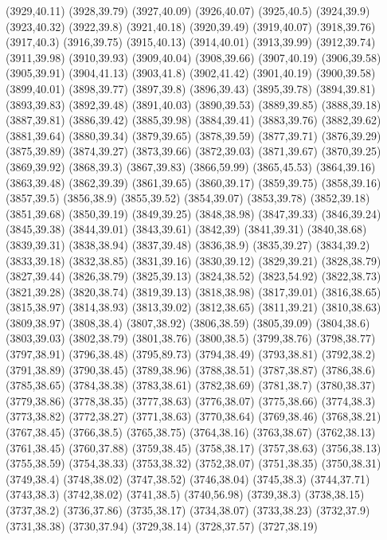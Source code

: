 (3929,40.11)
(3928,39.79)
(3927,40.09)
(3926,40.07)
(3925,40.5)
(3924,39.9)
(3923,40.32)
(3922,39.8)
(3921,40.18)
(3920,39.49)
(3919,40.07)
(3918,39.76)
(3917,40.3)
(3916,39.75)
(3915,40.13)
(3914,40.01)
(3913,39.99)
(3912,39.74)
(3911,39.98)
(3910,39.93)
(3909,40.04)
(3908,39.66)
(3907,40.19)
(3906,39.58)
(3905,39.91)
(3904,41.13)
(3903,41.8)
(3902,41.42)
(3901,40.19)
(3900,39.58)
(3899,40.01)
(3898,39.77)
(3897,39.8)
(3896,39.43)
(3895,39.78)
(3894,39.81)
(3893,39.83)
(3892,39.48)
(3891,40.03)
(3890,39.53)
(3889,39.85)
(3888,39.18)
(3887,39.81)
(3886,39.42)
(3885,39.98)
(3884,39.41)
(3883,39.76)
(3882,39.62)
(3881,39.64)
(3880,39.34)
(3879,39.65)
(3878,39.59)
(3877,39.71)
(3876,39.29)
(3875,39.89)
(3874,39.27)
(3873,39.66)
(3872,39.03)
(3871,39.67)
(3870,39.25)
(3869,39.92)
(3868,39.3)
(3867,39.83)
(3866,59.99)
(3865,45.53)
(3864,39.16)
(3863,39.48)
(3862,39.39)
(3861,39.65)
(3860,39.17)
(3859,39.75)
(3858,39.16)
(3857,39.5)
(3856,38.9)
(3855,39.52)
(3854,39.07)
(3853,39.78)
(3852,39.18)
(3851,39.68)
(3850,39.19)
(3849,39.25)
(3848,38.98)
(3847,39.33)
(3846,39.24)
(3845,39.38)
(3844,39.01)
(3843,39.61)
(3842,39)
(3841,39.31)
(3840,38.68)
(3839,39.31)
(3838,38.94)
(3837,39.48)
(3836,38.9)
(3835,39.27)
(3834,39.2)
(3833,39.18)
(3832,38.85)
(3831,39.16)
(3830,39.12)
(3829,39.21)
(3828,38.79)
(3827,39.44)
(3826,38.79)
(3825,39.13)
(3824,38.52)
(3823,54.92)
(3822,38.73)
(3821,39.28)
(3820,38.74)
(3819,39.13)
(3818,38.98)
(3817,39.01)
(3816,38.65)
(3815,38.97)
(3814,38.93)
(3813,39.02)
(3812,38.65)
(3811,39.21)
(3810,38.63)
(3809,38.97)
(3808,38.4)
(3807,38.92)
(3806,38.59)
(3805,39.09)
(3804,38.6)
(3803,39.03)
(3802,38.79)
(3801,38.76)
(3800,38.5)
(3799,38.76)
(3798,38.77)
(3797,38.91)
(3796,38.48)
(3795,89.73)
(3794,38.49)
(3793,38.81)
(3792,38.2)
(3791,38.89)
(3790,38.45)
(3789,38.96)
(3788,38.51)
(3787,38.87)
(3786,38.6)
(3785,38.65)
(3784,38.38)
(3783,38.61)
(3782,38.69)
(3781,38.7)
(3780,38.37)
(3779,38.86)
(3778,38.35)
(3777,38.63)
(3776,38.07)
(3775,38.66)
(3774,38.3)
(3773,38.82)
(3772,38.27)
(3771,38.63)
(3770,38.64)
(3769,38.46)
(3768,38.21)
(3767,38.45)
(3766,38.5)
(3765,38.75)
(3764,38.16)
(3763,38.67)
(3762,38.13)
(3761,38.45)
(3760,37.88)
(3759,38.45)
(3758,38.17)
(3757,38.63)
(3756,38.13)
(3755,38.59)
(3754,38.33)
(3753,38.32)
(3752,38.07)
(3751,38.35)
(3750,38.31)
(3749,38.4)
(3748,38.02)
(3747,38.52)
(3746,38.04)
(3745,38.3)
(3744,37.71)
(3743,38.3)
(3742,38.02)
(3741,38.5)
(3740,56.98)
(3739,38.3)
(3738,38.15)
(3737,38.2)
(3736,37.86)
(3735,38.17)
(3734,38.07)
(3733,38.23)
(3732,37.9)
(3731,38.38)
(3730,37.94)
(3729,38.14)
(3728,37.57)
(3727,38.19)
